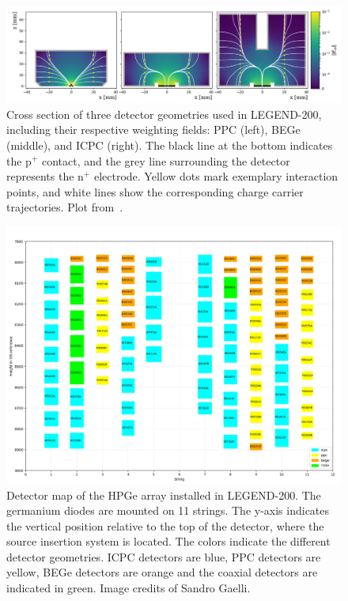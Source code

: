 \begin{figure}
    \centering
    \includegraphics[width=1\linewidth]{figures/03_legend/Detectors_LEGEND.png}
    \caption{Cross section of three detector geometries used in LEGEND-200, including their respective weighting fields: PPC (left), BEGe (middle), and ICPC (right). The black line at the bottom indicates the p$^+$ contact, and the grey line surrounding the detector represents the n$^+$ electrode. Yellow dots mark exemplary interaction points, and white lines show the corresponding charge carrier trajectories. Plot from~\cite{collaboration_legend-1000_2021}.}
    \label{fig:legend_hpge_types}
\end{figure}



\begin{figure}[t]
    \centering
    \includegraphics[width=0.95\linewidth]{figures/03_legend/improved_detector_arrangement_SGaelli.png}
    \caption{Detector map of the HPGe array installed in LEGEND-200. The germanium diodes are mounted on 11 strings. The y-axis indicates the vertical position relative to the top of the detector, where the source insertion system is located. The colors indicate the different detector geometries. ICPC detectors are blue, PPC detectors are yellow, BEGe detectors are orange and the coaxial detectors are indicated in green. Image credits of Sandro Gaelli.}
    \label{fig:legend_hpge_array}
\end{figure}




